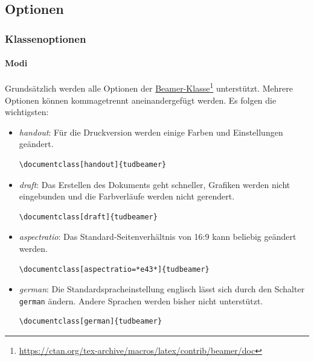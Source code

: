 \documentclass[german,notoc,draft]{tudbeamer}%
\begin{document}
\subsection{Optionen}
\begin{frame}[fragile]
	\frametitle{Klassenoptionen}
	\framesubtitle{Modi}

	Grundsätzlich werden alle Optionen der \href{https://ctan.org/tex-archive/macros/latex/contrib/beamer/doc}{		Beamer-Klasse}\footnote{\href{https://ctan.org/tex-archive/macros/latex/contrib/beamer/doc}{
				\url{https://ctan.org/tex-archive/macros/latex/contrib/beamer/doc}}}	
	unterstützt. Mehrere Optionen können kommagetrennt aneinandergefügt werden. Es folgen die wichtigsten:
	\begin{itemize}
		\item \emph{handout}: Für die Druckversion werden einige Farben und Einstellungen geändert.
			\begin{lstlisting}[gobble=8,style=latex,numbers=none]
				\documentclass[handout]{tudbeamer}
			\end{lstlisting}
		\item \emph{draft}: Das Erstellen des Dokuments geht schneller, Grafiken werden nicht eingebunden und die Farbverläufe werden nicht gerendert.
			\begin{lstlisting}[gobble=8,style=latex,numbers=none]
				\documentclass[draft]{tudbeamer}
			\end{lstlisting}
		\item \emph{aspectratio}: Das Standard-Seitenverhältnis von 16:9 kann beliebig geändert werden.
			\begin{lstlisting}[gobble=8,style=latex,numbers=none]
				\documentclass[aspectratio=*e43*]{tudbeamer}
			\end{lstlisting} 
		\item \emph{german}: Die Standardspracheinstellung englisch lässt sich durch den Schalter \texttt{german} ändern. Andere Sprachen werden bisher nicht unterstützt.
			\begin{lstlisting}[gobble=8,style=latex,numbers=none]
				\documentclass[german]{tudbeamer}
			\end{lstlisting} 
	\end{itemize}
\end{frame}
\end{document}
